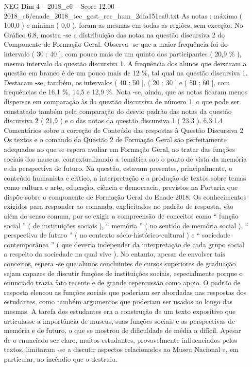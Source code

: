 \begin{textsample}{NEG Dim 4 – 2018\_c6 – Score 12.00 – 2018\_c6/enade\_2018\_tec\_gest\_rec\_hum\_2dfa151ea0.txt}
As notas : máxima ( 100,0 ) e mínima ( 0,0 ), foram as mesmas em todas as regiões, sem exceção.
No Gráfico 6.8, mostra -se a distribuição das notas na questão discursiva 2 do Componente de Formação Geral.
Observa -se que a maior frequência foi do intervalo ( 30 ; 40 ], com pouco mais de um quinto dos participantes ( 20,9 \% ), mesmo intervalo da questão discursiva 1.
A frequência dos alunos que deixaram a questão em branco é de um pouco mais de 12 \%, tal qual na questão discursiva 1.
Destacam -se, também, os intervalos ( 40 ; 50 ], ( 20 ; 30 ] e ( 50 ; 60 ], com frequências de 16,1 \%, 14,5 e 12,9 \%.
Nota -se, ainda, que as notas ficaram menos dispersas em comparação às da questão discursiva de número 1, o que pode ser constatado também pela comparação do desvio padrão das notas da questão discursiva 2 ( 21,9 ) e o das notas da questão discursiva 1 ( 23,3 ). 6.3.1.4 Comentários sobre a correção de Conteúdo das respostas à Questão Discursiva 2 Os textos e o comando da Questão 2 de Formação Geral são perfeitamente adequados ao que se espera avaliar em Formação Geral, ao tratar das funções sociais dos museus, contextualizando a temática sob o ponto de vista da memória e da perspectiva de futuro.
Na questão, estavam presentes, principalmente, o conteúdo humanista e crítico, a interpretação e a produção de textos sobre temas como cultura e arte, educação, ciência e democracia, previstos na Portaria que dispõe sobre o componente de Formação Geral do Enade 2018.
Os conhecimentos exigidos para responder ao comando, explicitados no padrão de resposta, vão além do senso comum, por se exigir a compreensão de conceitos como “ função social ” ( de instituições sociais ), “ memória ” ( no sentido de memória social ), “ perspectiva de futuro ” ( no contexto sócio-histórico-cultural ) e “ sociedade contemporânea ” ( que deveria independer da interpretação de cada grupo social a respeito da sociedade na qual vive ).
No entanto, apesar de envolver tais conceitos, espera -se que alunos concluintes de cursos superiores de graduação sejam capazes de discutir funções de instituições sociais, especialmente porque o enunciado trazia fato recente e de grande repercussão como apoio.
O padrão de resposta elencou as funções sociais que poderiam ser abordadas nas respostas dos estudantes, como também argumentos que poderiam ser usados ao longo das mesmas.
A tarefa dos estudantes era a construção de um texto expositivo que articulasse a importância de museus, suas funções sociais e as perspectivas de memória e de futuro, o que se mostrou de dificuldade de média a difícil.
Apesar de o enunciado ser claro, muitos estudantes, provavelmente influenciados pelos textos, limitaram -se a discutir aspectos relacionados ao Museu Nacional e, em particular, ao incêndio que o destruiu.

\end{textsample}

